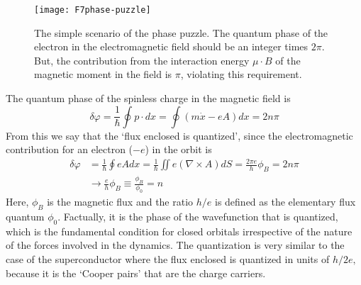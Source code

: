 \documentclass[aps,preprint,12pt,tightenlines]{revtex4}%
\begin{document}
\begin{figure}
	\centering
	\texttt{[image: F7phase-puzzle]}
	\caption{The simple scenario of the phase puzzle. The quantum phase of the
		electron in the electromagnetic field should be an integer times $2\pi$. But,
		the contribution from the interaction energy $\mu\cdot B$ of the magnetic
		moment in the field is $\pi$, violating this requirement.}
	\label{fig:phase-puzzle}
\end{figure}

The quantum phase of the spinless charge in the magnetic field is
\begin{equation}
\delta\varphi=\frac{1}{\hbar}\oint p\cdot dx=\oint\left(  m\dot{x}-eA\right)
dx=2n\pi
\end{equation}
From this we say that the `flux enclosed is quantized', since the
electromagnetic contribution for an electron ($-e$) in the orbit is%
\begin{align}
\delta\varphi &  =\frac{1}{\hbar}\oint eAdx=\frac{1}{\hbar}\iint e\left(
\nabla\times A\right)  dS=\frac{2\pi e}{h}\phi_{B}=2n\pi\\
&  \rightarrow\frac{e}{h}\phi_{B}\equiv\frac{\phi_{B}}{\phi_{0}}=n
\end{align}
Here, $\phi_{B}$ is the magnetic flux and the ratio $h/e$ is defined as the
elementary flux quantum $\phi_{0}$. Factually, it is the phase of the
wavefunction that is quantized, which is the fundamental condition for closed
orbitals irrespective of the nature of the forces involved in the dynamics.
The quantization is very similar to the case of the superconductor where the
flux enclosed is quantized in units of $h/2e,$ because it is the `Cooper
pairs' that are the charge carriers.
\end{document}
